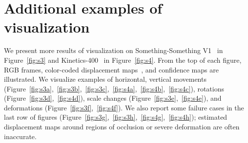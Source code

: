 \documentclass[runningheads]{llncs}
\begin{document}
\section{Additional examples of visualization}
We present more results of visualization on Something-Something V1~\cite{goyal2017something} in Figure~\ref{fig:s3} and Kinetics-400~\cite{kay2017kinetics} in Figure~\ref{fig:s4}.
From the top of each figure, RGB frames, color-coded displacement maps~\cite{baker2011database}, and confidence maps are illustrated.
We visualize examples of horizontal, vertical movements (Figure~\ref{fig:s3a},~\ref{fig:s3b},~\ref{fig:s3c},~\ref{fig:s4a},~\ref{fig:s4b},~\ref{fig:s4c}), rotations (Figure~\ref{fig:s3d},~\ref{fig:s4d}), scale changes (Figure~\ref{fig:s3e},~\ref{fig:s4e}), and deformations (Figure~\ref{fig:s3f},~\ref{fig:s4f}).
We also report some failure cases in the last row of figures (Figure~\ref{fig:s3g},~\ref{fig:s3h},~\ref{fig:s4g},~\ref{fig:s4h}); estimated displacement maps around regions of occlusion or severe deformation are often inaccurate.   

\clearpage

\begin{table}[t]
  \begin{center}
    \caption{ResNet \& TSM ResNet backbone.}
    \label{tab:resnet}   
  \end{center}
\end{table}
\end{document}
